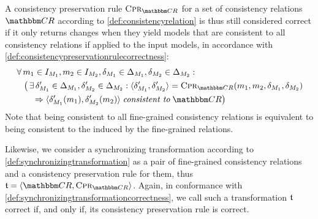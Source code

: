 A consistency preservation rule $\consistencypreservationrule{\consistencyrelationset{CR}}$ for a set of consistency relations $\consistencyrelationset{CR}$ according to \autoref{def:consistencyrelation} is thus still considered correct if it only returns changes when they yield models that are consistent to all consistency relations if applied to the input models, in accordance with \autoref{def:consistencypreservationrulecorrectness}:
\begin{align*}
    &
    \forall \model{m}{1} \in \metamodelinstanceset{M}{1}, \model{m}{2} \in \metamodelinstanceset{M}{2}, \change{\metamodel{M}{1}} \in \changeuniverse{\metamodel{M}{1}}, \change{\metamodel{M}{2}} \in \changeuniverse{\metamodel{M}{2}} : \\
    & \formulaskip
    \big( \exists \change{\metamodel{M}{1}}' \in \changeuniverse{\metamodel{M}{1}}, \change{\metamodel{M}{2}}' \in \changeuniverse{\metamodel{M}{2}} : \tupled{\change{\metamodel{M}{1}}', \change{\metamodel{M}{2}}'} = \consistencypreservationrule{\consistencyrelationset{CR}}(\model{m}{1}, \model{m}{2}, \change{\metamodel{M}{1}}, \change{\metamodel{M}{2}}) \\
    & \formulaskip\formulaskip
    \Rightarrow \tupled{\change{\metamodel{M}{1}}'(\model{m}{1}),\change{\metamodel{M}{2}}'(\model{m}{2})} \consistenttomath \consistencyrelationset{CR} \big)
\end{align*}
Note that being consistent to all fine-grained consistency relations is equivalent to being consistent to the \modellevelconsistencyrelation induced by the fine-grained relations.

Likewise, we consider a synchronizing transformation according to \autoref{def:synchronizingtransformation} as a pair of fine-grained consistency relations and a consistency preservation rule for them, thus $\transformation{t} = \tupled{\consistencyrelationset{CR}, \consistencypreservationrule{\consistencyrelationset{CR}}}$.
Again, in conformance with \autoref{def:synchronizingtransformationcorrectness}, we call such a transformation $\transformation{t}$ correct if, and only if, its consistency preservation rule is correct.
